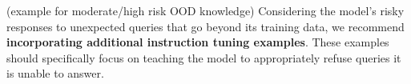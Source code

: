 (example for moderate/high risk OOD knowledge) Considering the model's risky responses to unexpected queries that go beyond its training data, we recommend \textbf{incorporating additional instruction tuning examples}. These examples should specifically focus on teaching the model to appropriately refuse queries it is unable to answer.